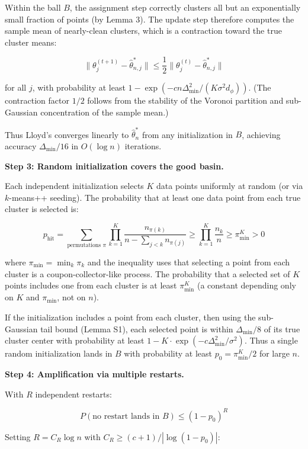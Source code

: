 \documentclass[
  12pt,
]{ctexart}
\begin{document}
Within the ball \(B\), the assignment step correctly clusters all but an
exponentially small fraction of points (by Lemma 3). The update step
therefore computes the sample mean of nearly-clean clusters, which is a
contraction toward the true cluster means:

\[\|\theta_j^{(t+1)} - \hat{\theta}_{n,j}^*\| \leq \frac{1}{2} \|\theta_j^{(t)} - \hat{\theta}_{n,j}^*\|\]

for all \(j\), with probability at least
\(1 - \exp(-c n \Delta_{\min}^2 / (K \sigma^2 d_\phi))\). (The
contraction factor \(1/2\) follows from the stability of the Voronoi
partition and sub-Gaussian concentration of the sample mean.)

Thus Lloyd's converges linearly to \(\hat{\theta}_n^*\) from any
initialization in \(B\), achieving accuracy \(\Delta_{\min}/16\) in
\(O(\log n)\) iterations.

\textbf{Step 3: Random initialization covers the good basin.}

Each independent initialization selects \(K\) data points uniformly at
random (or via \(k\)-means++ seeding). The probability that at least one
data point from each true cluster is selected is:

\[p_{\text{hit}} = \sum_{\text{permutations } \pi} \prod_{k=1}^K \frac{n_{\pi(k)}}{n - \sum_{j<k} n_{\pi(j)}} \geq \prod_{k=1}^K \frac{n_k}{n} \geq \pi_{\min}^K > 0\]

where \(\pi_{\min} = \min_k \pi_k\) and the inequality uses that
selecting a point from each cluster is a coupon-collector-like process.
The probability that a selected set of \(K\) points includes one from
each cluster is at least \(\pi_{\min}^K\) (a constant depending only on
\(K\) and \(\pi_{\min}\), not on \(n\)).

If the initialization includes a point from each cluster, then using the
sub-Gaussian tail bound (Lemma S1), each selected point is within
\(\Delta_{\min}/8\) of its true cluster center with probability at least
\(1 - K \cdot \exp(-c \Delta_{\min}^2/\sigma^2)\). Thus a single random
initialization lands in \(B\) with probability at least
\(p_0 = \pi_{\min}^K / 2\) for large \(n\).

\textbf{Step 4: Amplification via multiple restarts.}

With \(R\) independent restarts:

\[P(\text{no restart lands in } B) \leq (1 - p_0)^R\]

Setting \(R = C_R \log n\) with \(C_R \geq (c+1)/|\log(1-p_0)|\):
\end{document}
